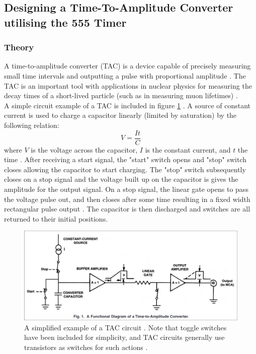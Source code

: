 \documentclass[%
 reprint,
 amsmath,amssymb,
 aps,
]{revtex4-2}
\begin{document}
    \subsection{Designing a Time-To-Amplitude Converter utilising the 555 Timer}

        \subsubsection{Theory}
        A time-to-amplitude converter (TAC) is a device capable of precisely measuring small time intervals and outputting a pulse with proportional amplitude \cite{ortec}. The TAC is an important tool with applications in nuclear physics for measuring the decay times of a short-lived particle (such as in measuring muon lifetimes) \cite{horowitz, muons}.\\

        A simple circuit example of a TAC is included in figure \ref{fig:tacManual} \cite{ortec}. A source of constant current is used to charge a capacitor linearly (limited by saturation) by the following relation:
        \begin{equation}
            V = \frac{I t}{C}
        \end{equation}where $V$ is the voltage across the capacitor, $I$ is the constant current, and $t$ the time \cite{ortec}. After receiving a start signal, the "start" switch opens and "stop" switch closes allowing the capacitor to start charging. The "stop" switch subsequently closes on a stop signal and the voltage built up on the capacitor is gives the amplitude for the output signal. On a stop signal, the linear gate opens to pass the voltage pulse out, and then closes after some time resulting in a fixed width rectangular pulse output \cite{ortec}. The capacitor is then discharged and switches are all returned to their initial positions.\\

        \begin{figure}
            \includegraphics[width=1.8\columnwidth]{Images/tacManual}
            \caption{\label{fig:tacManual}A simplified example of a TAC circuit \cite{ortec}. Note that toggle switches have been included for simplicity, and TAC circuits generally use transistors as switches for such actions \cite{ortec}.}
        \end{figure}
\end{document}
